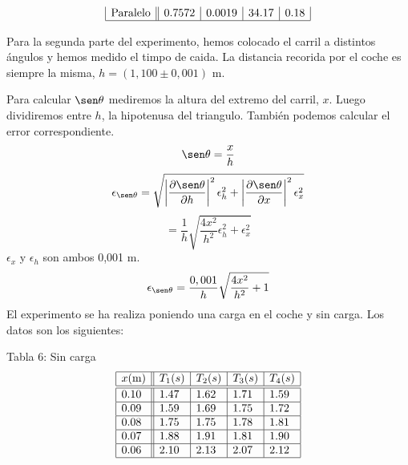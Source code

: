 \documentclass{article}
\begin{document}
\begin{multicols}{2}
\begin{center}
$$\begin{array}{|l||l|l|l|l|}
        \text{Paralelo}  & 0.7572 & 0.0019 & 34.17 & 0.18  \\ \hline
    \end{array}
    $$
\end{center}
Para la segunda parte del experimento, hemos colocado el carril a distintos ángulos y hemos medido el timpo de caida. La distancia recorida por el coche es siempre la misma, $h = (1,100 \pm 0,001)$ m.
\begin{center}
\end{center}
Para calcular $\sen \theta$ mediremos la altura del extremo del carril, $x$. Luego dividiremos entre $h$, la hipotenusa del triangulo. También podemos calcular el error correspondiente.
$$
\sen\theta = \frac{x}{h}
$$
$$
\epsilon_{\sen\theta} = \sqrt{
    \left| \frac{\partial \sen\theta}{\partial h} \right|^2 \epsilon_h^2
    +
    \left| \frac{\partial \sen\theta}{\partial x} \right|^2 \epsilon_x^2
}
$$
$$
=
\frac{1}{h}
\sqrt{
    \frac{4x^2}{h^2} \epsilon_h^2 + \epsilon_x^2
}
$$
$\epsilon_x$ y $\epsilon_h$ son ambos 0,001 m.
$$
\epsilon_{\sen\theta}
=
\frac{0,001}{h}
\sqrt{
    \frac{4x^2}{h^2} +1
}
$$
El experimento se ha realiza poniendo una carga en el coche y sin carga. Los datos son los siguientes:
\begin{center}
    Tabla 6: Sin carga
    $$
    \begin{array}{|l||l|l|l|l|} \hline
        x\text{(m)} & T_1\text(s) & T_2\text(s) & T_3\text(s) & T_4\text(s) \\ \hline \hline
        0.10  & 1.47 & 1.62 & 1.71 & 1.59  \\ \hline
        0.09  & 1.59 & 1.69 & 1.75 & 1.72  \\ \hline
        0.08  & 1.75 & 1.75 & 1.78 & 1.81  \\ \hline
        0.07  & 1.88 & 1.91 & 1.81 & 1.90  \\ \hline
        0.06  & 2.10 & 2.13 & 2.07 & 2.12  \\ \hline

\end{array}$$
\end{center}
\end{multicols}
\end{document}

